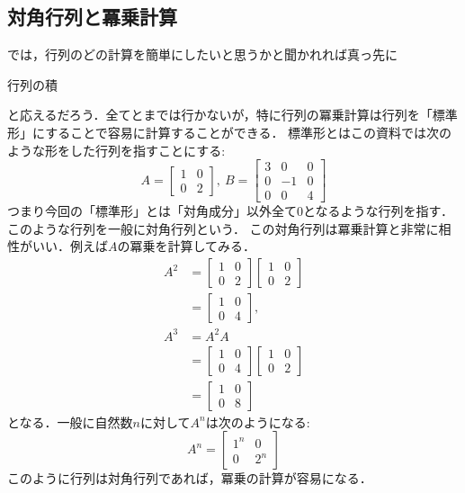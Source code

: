 \documentclass[a4paper,12pt,autodetect-engine,dvipdfmx]{jsarticle}
\theoremstyle{definition}
\begin{document}
\subsection{対角行列と冪乗計算}
では，行列のどの計算を簡単にしたいと思うかと聞かれれば真っ先に
\begin{center}
    行列の積
\end{center}
と応えるだろう．全てとまでは行かないが，特に行列の冪乗計算は行列を「標準形」にすることで容易に計算することができる．
標準形とはこの資料では次のような形をした行列を指すことにする:
\begin{equation*}
    A=\begin{bmatrix}
        1 & 0 \\
        0 & 2
    \end{bmatrix},\ 
    B=\begin{bmatrix}
        3 & 0 & 0\\
        0 & -1 & 0\\
        0 & 0 & 4
    \end{bmatrix}
\end{equation*}
つまり今回の「標準形」とは「対角成分」以外全て0となるような行列を指す．このような行列を一般に対角行列という．
この対角行列は冪乗計算と非常に相性がいい．例えば$A$の冪乗を計算してみる．
\begin{align*}
    A^2 &=
    \begin{bmatrix}
        1 & 0\\
        0 & 2
    \end{bmatrix}
    \begin{bmatrix}
        1 & 0\\
        0 & 2
    \end{bmatrix}\\
    &=
    \begin{bmatrix}
        1 & 0\\
        0 & 4
    \end{bmatrix},\ \\
    A^3 &=A^2 A\\
    &=
    \begin{bmatrix}
        1 & 0\\
        0 & 4
    \end{bmatrix}
    \begin{bmatrix}
        1 & 0\\
        0 & 2
    \end{bmatrix}\\
    &=
    \begin{bmatrix}
        1 & 0\\
        0 & 8
    \end{bmatrix}
\end{align*}
となる．一般に自然数$n$に対して$A^n$は次のようになる:
\begin{equation*}
    A^n = 
    \begin{bmatrix}
        1^n & 0\\
        0 & 2^n
    \end{bmatrix}
\end{equation*}
このように行列は対角行列であれば，冪乗の計算が容易になる．
\end{document}
